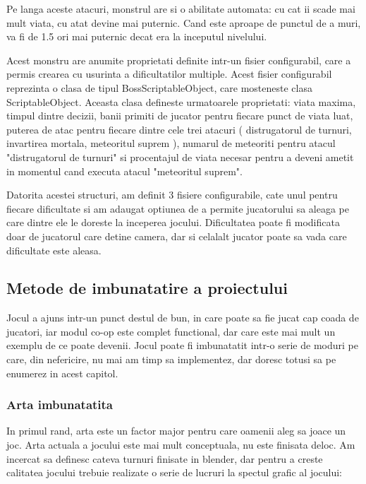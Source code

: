 \documentclass[12pt, a4paper]{article}
\begin{document}
	Pe langa aceste atacuri, monstrul are si o abilitate automata: cu cat ii scade mai mult viata, cu atat devine mai puternic. Cand este aproape de punctul de a muri, va fi de 1.5 ori mai puternic decat era la inceputul nivelului.
	\newline
	
	Acest monstru are anumite proprietati definite intr-un fisier configurabil, care a permis crearea cu usurinta a dificultatilor multiple. Acest fisier configurabil reprezinta o clasa de tipul BossScriptableObject, care mosteneste clasa ScriptableObject. Aceasta clasa defineste urmatoarele proprietati: viata maxima, timpul dintre decizii, banii primiti de jucator pentru fiecare punct de viata luat, puterea de atac pentru fiecare dintre cele trei atacuri ( distrugatorul de turnuri, invartirea mortala, meteoritul suprem ), numarul de meteoriti pentru atacul "distrugatorul de turnuri" si procentajul de viata necesar pentru a deveni ametit in momentul cand executa atacul "meteoritul suprem".
	\newline
	
	Datorita acestei structuri, am definit 3 fisiere configurabile, cate unul pentru fiecare dificultate si am adaugat optiunea de a permite jucatorului sa aleaga pe care dintre ele le doreste la inceperea jocului. Dificultatea poate fi modificata doar de jucatorul care detine camera, dar si celalalt jucator poate sa vada care dificultate este aleasa.
	
	
	
	
	
	\subsection{Metode de imbunatatire a proiectului}
	
	Jocul a ajuns intr-un punct destul de bun, in care poate sa fie jucat cap coada de jucatori, iar modul co-op este complet functional, dar care este mai mult un exemplu de ce poate devenii. Jocul poate fi imbunatatit intr-o serie de moduri pe care, din nefericire, nu mai am timp sa implementez, dar doresc totusi sa pe enumerez in acest capitol.
	
	
	
	
	
	\subsubsection{Arta imbunatatita}
	
	In primul rand, arta este un factor major pentru care oamenii aleg sa joace un joc. Arta actuala a jocului este mai mult conceptuala, nu este finisata deloc. Am incercat sa definesc cateva turnuri finisate in blender, dar pentru a creste calitatea jocului trebuie realizate o serie de lucruri la spectul grafic al jocului:
	
\end{document}
